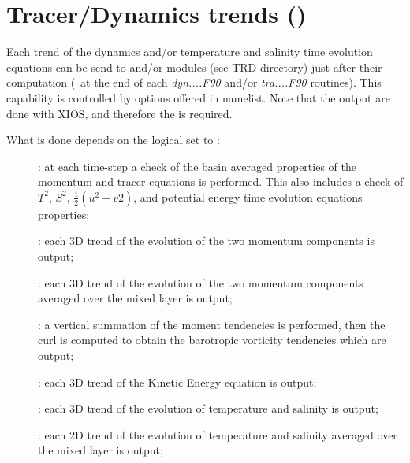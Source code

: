 \documentclass[../main/NEMO_manual]{subfiles}
\begin{document}
\section[Tracer/Dynamics trends (\forcode{&namtrd})]{Tracer/Dynamics trends (\protect{})}
\label{sec:DIA_trd}

\begin{listing}
  \caption{}
  \label{lst:namtrd}
\end{listing}

Each trend of the dynamics and/or temperature and salinity time evolution equations can be send to
 and/or  modules (see TRD directory) just after their computation
(\ie\ at the end of each \textit{dyn....F90} and/or \textit{tra....F90} routines).
This capability is controlled by options offered in  namelist.
Note that the output are done with XIOS, and therefore the  is required.

What is done depends on the  logical set to :

\begin{description}
\item [{}]: at each  time-step a check of the basin averaged properties of
  the momentum and tracer equations is performed.
  This also includes a check of $T^2$, $S^2$, $\tfrac{1}{2} (u^2+v2)$,
  and potential energy time evolution equations properties;
\item [{}]: each 3D trend of the evolution of the two momentum components is output;
\item [{}]: each 3D trend of the evolution of the two momentum components averaged over the mixed layer is output;
\item [{}]: a vertical summation of the moment tendencies is performed,
  then the curl is computed to obtain the barotropic vorticity tendencies which are output;
\item [{}]  : each 3D trend of the Kinetic Energy equation is output;
\item [{}]: each 3D trend of the evolution of temperature and salinity is output;
\item [{}]: each 2D trend of the evolution of temperature and salinity averaged over the mixed layer is output;
\end{description}
\end{document}
